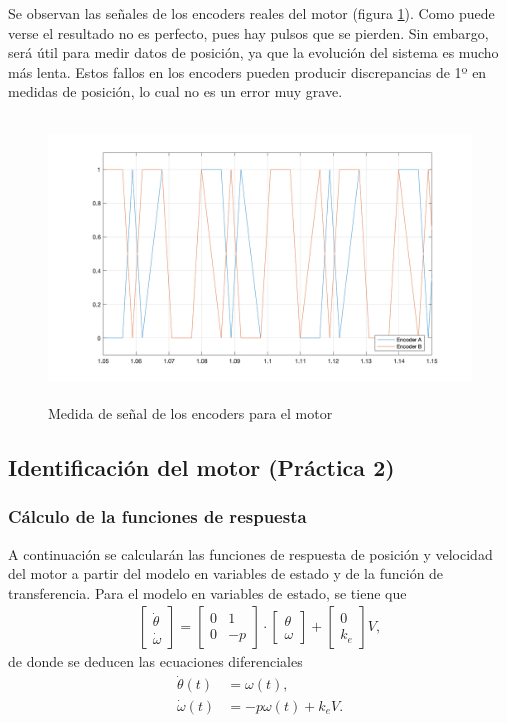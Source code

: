 \documentclass[a4paper, 12pt]{article}
\begin{document}
Se observan las señales de los encoders reales del motor (figura \ref{ec}). Como puede verse el resultado no es perfecto, pues hay pulsos que se pierden. Sin embargo, será útil para medir datos de posición, ya que la evolución del sistema es mucho más lenta. Estos fallos en los encoders pueden producir discrepancias de 1º en medidas de posición, lo cual no es un error muy grave. 
\begin{figure}[h!]
	\centering
	\includegraphics[height = 7.5cm]{p2/encoders}
	\caption{Medida de señal de los encoders para el motor} \label{ec}
\end{figure}

\subsection{Identificación del motor (Práctica 2)} 
\subsubsection{Cálculo de la funciones de respuesta}

A continuación se calcularán las funciones de respuesta de posición y velocidad del motor a partir del modelo en variables de estado y de la función de transferencia. 
Para el modelo en variables de estado, se tiene que 
\begin{align}
	\begin{bmatrix} \dot\theta \\ \dot\omega \end{bmatrix}  =  \begin{bmatrix} 0 & 1 \\ 0 & -p \end{bmatrix} \cdot \begin{bmatrix} \theta \\ \omega  \end{bmatrix} + \begin{bmatrix} 0 \\ k_e \end{bmatrix} V,
\end{align}
de donde se deducen las ecuaciones diferenciales 
\begin{align}
	\dot\theta(t) &= \omega(t) , \label{posdot} \\
	\dot\omega(t) &= -p \omega(t) + k_e V. \label{veldot}
\end{align}
\end{document}
